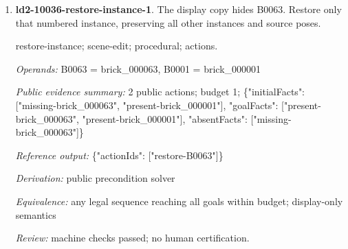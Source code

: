 \begin{enumerate}
\par{\small source-sequence; scene-edit; procedural; actions.\par\textit{Operands:} B0029 = brick\_000029, B0027 = brick\_000027, B0020 = brick\_000020, B0021 = brick\_000021, B0015 = brick\_000015, B0019 = brick\_000019, B0017 = brick\_000017, B0002 = brick\_000002, B0008 = brick\_000008, B0003 = brick\_000003, B0004 = brick\_000004, B0014 = brick\_000014, B0012 = brick\_000012, B0028 = brick\_000028, B0023 = brick\_000023, B0024 = brick\_000024, B0025 = brick\_000025, B0026 = brick\_000026, B0001 = brick\_000001, B0007 = brick\_000007, B0006 = brick\_000006, B0009 = brick\_000009, B0010 = brick\_000010, B0018 = brick\_000018, B0016 = brick\_000016, B0005 = brick\_000005, B0013 = brick\_000013, B0011 = brick\_000011, B0022 = brick\_000022\par\textit{Public evidence summary:} 6 public actions; budget 6; \{"initialFacts": ["start"], "goalFacts": ["done-6"], "absentFacts": []\}\par\textit{Reference output:} \{"actionIds": ["step-1", "step-2", "step-3", "step-4", "step-5", "step-6"]\}\par\textit{Derivation:} public precondition solver\par\textit{Equivalence:} any legal sequence reaching all goals within budget; display-only semantics\par\textit{Review:} pending required human review.}
\item \textbf{ld2-10036-restore-instance-1}. The display copy hides B0063. Restore only that numbered instance, preserving all other instances and source poses.
\par{\small restore-instance; scene-edit; procedural; actions.\par\textit{Operands:} B0063 = brick\_000063, B0001 = brick\_000001\par\textit{Public evidence summary:} 2 public actions; budget 1; \{"initialFacts": ["missing-brick\_000063", "present-brick\_000001"], "goalFacts": ["present-brick\_000063", "present-brick\_000001"], "absentFacts": ["missing-brick\_000063"]\}\par\textit{Reference output:} \{"actionIds": ["restore-B0063"]\}\par\textit{Derivation:} public precondition solver\par\textit{Equivalence:} any legal sequence reaching all goals within budget; display-only semantics\par\textit{Review:} machine checks passed; no human certification.}

\end{enumerate}
